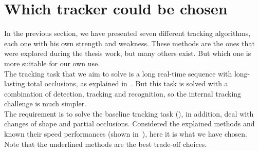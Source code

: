 \section{Which tracker could be chosen}
In the previous section, we have presented seven different tracking algorithms, each one with his own strength and weakness. These methods are the ones that were explored during the thesis work, but many others exist. But which one is more suitable for our own use.\\
The tracking task that we aim to solve is a long real-time sequence with long-lasting total occlusions, as explained in~. But this task is solved with a combination of detection, tracking and recognition, so the internal tracking challenge is much simpler.\\
The requirement is to solve the baseline tracking task (), in addition, deal with changes of shape and partial occlusions. Considered the explained methods and known their speed performances (shown in~), here it is what we have chosen. Note that the underlined methods are the best trade-off choices. 
